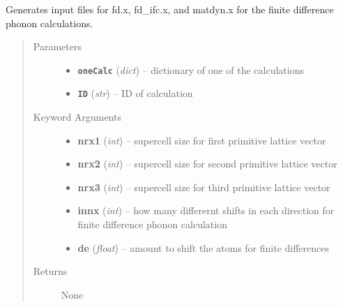 \documentclass[letterpaper,10pt,english]{sphinxmanual}
\begin{document}

\begin{fulllineitems}
\label{run:run.write_fdx_template}
Generates input files for fd.x, fd\_ifc.x, and matdyn.x for the finite
difference phonon calculations.
\begin{quote}\begin{description}
\item[{Parameters}] \leavevmode\begin{itemize}
\item {} 
\textbf{\texttt{oneCalc}} (\emph{dict}) -- dictionary of one of the calculations

\item {} 
\textbf{\texttt{ID}} (\emph{str}) -- ID of calculation

\end{itemize}

\item[{Keyword Arguments}] \leavevmode\begin{itemize}
\item {} 
\textbf{nrx1} (\emph{int}) --
supercell size for first primitive lattice vector

\item {} 
\textbf{nrx2} (\emph{int}) --
supercell size for second primitive lattice vector

\item {} 
\textbf{nrx3} (\emph{int}) --
supercell size for third primitive lattice vector

\item {} 
\textbf{innx} (\emph{int}) --
how many differernt shifts in each direction for
finite difference phonon calculation

\item {} 
\textbf{de} (\emph{float}) --
amount to shift the atoms for finite differences

\end{itemize}

\item[{Returns}] \leavevmode
None

\end{description}\end{quote}

\end{fulllineitems}
\end{document}
